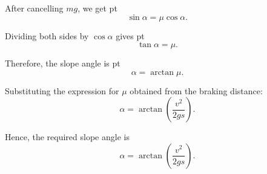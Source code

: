 \documentclass[t,aspectratio=169]{beamer}
\begin{document}
\begin{frame}
\begin{enumerate}
After cancelling $mg$, we get
 pt
$$\sin\alpha = \mu\cos\alpha.$$

Dividing both sides by $\cos\alpha$ gives
 pt
$$\tan\alpha = \mu.$$

Therefore, the slope angle is
 pt
$$\alpha = \arctan\mu.$$

\pagebreak
Substituting the expression for $\mu$ obtained from the braking distance:
$$\alpha = \arctan\left(\frac{v^2}{2gs}\right).$$

Hence, the required slope angle is
$$\boxed{\alpha = \arctan\left(\frac{v^2}{2gs}\right)}.$$
\end{enumerate}

\end{frame}

\end{document}

